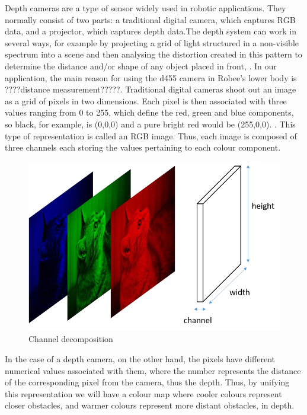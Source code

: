Depth cameras are a type of sensor widely used in robotic applications. They normally consist of two parts: a traditional digital camera, which captures RGB data, and a projector, which captures depth data.The depth system can work in several ways, for example by projecting a grid of light structured in a non-visible spectrum into a scene and then analysing the distortion created in this pattern to determine the distance and/or shape of any object placed in front, \citet{JONASSON2021112691}.
In our application, the main reason for using the d455 camera in Robee's lower body is ????distance measurement?????.
Traditional digital cameras shoot out an image as a grid of pixels in two dimensions. Each pixel is then associated with three values ranging from 0 to 255, which define the red, green and blue components, so black, for example, is (0,0,0) and a pure bright red would be (255,0,0). . This type of representation is called an RGB image. Thus, each image is composed of three channels each storing the values pertaining to each colour component.
\begin{figure}[H]
    \centering
    \includegraphics[scale=0.25]{Images/Chapter 3/rgb.jpeg}
    \caption{Channel decomposition}
    \label{fig:rgb}
\end{figure}
In the case of a depth camera, on the other hand, the pixels have different numerical values associated with them, where the number represents the distance of the corresponding pixel from the camera, thus the depth.
Thus, by unifying this representation we will have a colour map where cooler colours represent closer obstacles, and warmer colours represent more distant obstacles, in depth.

